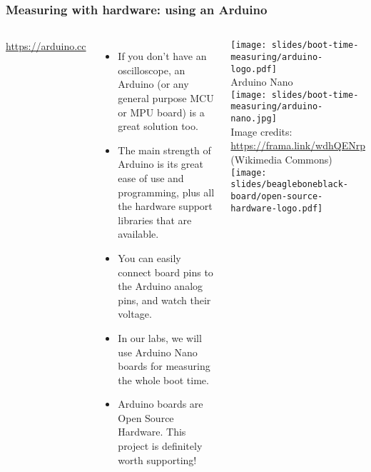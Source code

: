 \begin{frame}
\frametitle{Measuring with hardware: using an Arduino}
\begin{columns}
  \url{https://arduino.cc}
  \begin{itemize}
  \item If you don't have an oscilloscope, an Arduino (or any general
        purpose MCU or MPU board) is a great solution too.
  \item The main strength of Arduino is its great ease of use and
        programming, plus all the hardware support libraries that are available.
  \item You can easily connect board pins to the Arduino analog pins, and
        watch their voltage.
  \item In our labs, we will use Arduino Nano boards for measuring the
        whole boot time.
  \item Arduino boards are Open Source Hardware. This project is
      definitely worth supporting!
  \end{itemize}
  \begin{center}
  \tiny
  \texttt{[image: slides/boot-time-measuring/arduino-logo.pdf]}\\
  \vspace{1cm}
  Arduino Nano\\
  \texttt{[image: slides/boot-time-measuring/arduino-nano.jpg]}\\
  Image credits: \url{https://frama.link/wdhQENrp} (Wikimedia Commons)\\
  \vspace{1cm}
  \texttt{[image: slides/beagleboneblack-board/open-source-hardware-logo.pdf]}
  \end{center}
\end{columns}
\end{frame}

